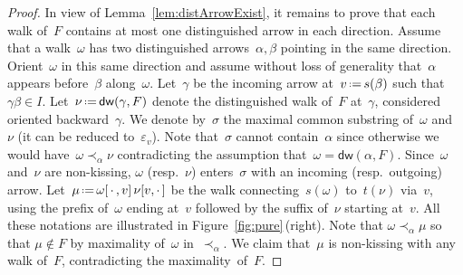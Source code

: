 \documentclass{amsart}
\theoremstyle{definition}
\newcommand{\eqdef}{\mbox{\,\raisebox{0.2ex}{\scriptsize\ensuremath{\mathrm:}}\ensuremath{=}\,}} %
\newcommand{\fref}[1]{Figure~\ref{#1}} %
\newcommand{\blossom}{^\text{\ding{96}}} %
\newcommand{\distinguishedWalk}[2]{\mathsf{dw}(#1,#2)} %
\begin{document}
\begin{proof}
In view of Lemma~\ref{lem:distArrowExist}, it remains to prove that each walk of~$F$ contains at most one distinguished arrow in each direction.
Assume that a walk~$\omega$ has two distinguished arrows~$\alpha, \beta$ pointing in the same direction.
Orient~$\omega$ in this same direction and assume without loss of generality that~$\alpha$ appears before~$\beta$ along~$\omega$.
Let~$\gamma$ be the incoming arrow at~$v \eqdef s(\beta)$ such that~$\gamma\beta \in I$.
Let~$\nu \eqdef \distinguishedWalk{\gamma}{F}$ denote the distinguished walk of~$F$ at~$\gamma$, considered oriented backward~$\gamma$.
We denote by~$\sigma$ the maximal common substring of~$\omega$ and~$\nu$ (it can be reduced to~$\varepsilon_v$).
Note that~$\sigma$ cannot contain~$\alpha$ since otherwise we would have~$\omega \prec_\alpha \nu$ contradicting the assumption that~$\omega = \distinguishedWalk{\alpha}{F}$. 
Since~$\omega$ and~$\nu$ are non-kissing, $\omega$ (resp.~$\nu$) enters~$\sigma$ with an incoming (resp.~outgoing) arrow.
Let~$\mu \eqdef \omega[\,\cdot\,, v] \, \nu[v, \cdot\,]$ be the walk connecting~$s(\omega)$ to~$t(\nu)$ via~$v$, using the prefix of~$\omega$ ending at~$v$ followed by the suffix of~$\nu$ starting at~$v$.
All these notations are illustrated in \fref{fig:pure}\,(right).
Note that $\omega \prec_\alpha \mu$ so that $\mu \notin F$ by maximality of~$\omega$ in~$\prec_\alpha$.
We claim that~$\mu$ is non-kissing with any walk of~$F$, contradicting the maximality~of~$F$.


\end{proof}
\end{document}

